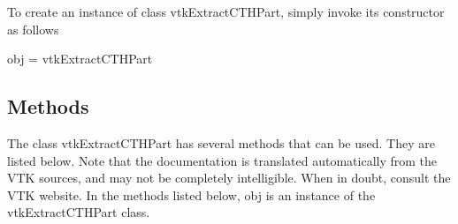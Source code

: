 To create an instance of class vtk\-Extract\-C\-T\-H\-Part, simply invoke its constructor as follows \begin{DoxyVerb}  obj = vtkExtractCTHPart
\end{DoxyVerb}
 \hypertarget{vtkwidgets_vtkxyplotwidget_Methods}{}\subsection{Methods}\label{vtkwidgets_vtkxyplotwidget_Methods}
The class vtk\-Extract\-C\-T\-H\-Part has several methods that can be used. They are listed below. Note that the documentation is translated automatically from the V\-T\-K sources, and may not be completely intelligible. When in doubt, consult the V\-T\-K website. In the methods listed below, {\ttfamily obj} is an instance of the vtk\-Extract\-C\-T\-H\-Part class. 
